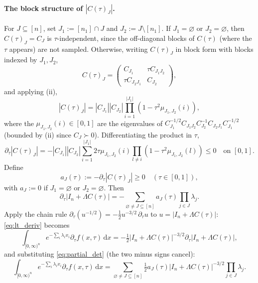 \documentclass[12pt,a4paper]{article}
\theoremstyle{definition}
\newcommand{\dd}{\mathrm{d}}
\begin{document}
\paragraph{The block structure of $|C(\tau)_J|$.}  For $J\subseteq[n]$, set
$J_1:=[n_1]\cap J$ and $J_2:=J\setminus[n_1]$.  If $J_1=\varnothing$
or $J_2=\varnothing$, then $C(\tau)_J=C_J$ is $\tau$-independent,
since the off-diagonal blocks of $C(\tau)$ (where the $\tau$ appears)
are not sampled.  Otherwise, writing $C(\tau)_J$ in block form with
blocks indexed by $J_1,J_2$,
\[
  C(\tau)_J
  =\begin{pmatrix}C_{J_1}&\tau C_{J_1J_2}\\
    \tau C_{J_2J_1}&C_{J_2}\end{pmatrix},
\]
and applying (ii),
\begin{equation}\label{eq:CtauJ}
  |C(\tau)_J|
  =|C_{J_1}||C_{J_2}|\prod_{i=1}^{|J_1|}(1-\tau^2\mu_{J_1,J_2}(i)),
\end{equation}
where the $\mu_{J_1,J_2}(i)\in[0,1]$ are the eigenvalues of
$C_{J_1}^{-1/2}C_{J_1J_2}C_{J_2}^{-1}C_{J_2J_1}C_{J_1}^{-1/2}$
(bounded by (ii) since $C_J\succ 0$).
Differentiating the product in $\tau$,
\[
  \partial_\tau|C(\tau)_J|
  =-|C_{J_1}||C_{J_2}|\sum_{i=1}^{|J_1|}2\tau\mu_{J_1,J_2}(i)
  \prod_{l\ne i}(1-\tau^2\mu_{J_1,J_2}(l))
  \leqslant 0\quad\text{on }[0,1].
\]
Define
\begin{equation}\label{eq:aJ}
  a_J(\tau):=-\partial_\tau|C(\tau)_J|\geqslant 0
  \quad(\tau\in[0,1]),
\end{equation}
with $a_J:=0$ if $J_1=\varnothing$ or $J_2=\varnothing$.  Then
\begin{equation}\label{eq:partial_det}
  \partial_\tau|I_n+\Lambda C(\tau)|
  =-\sum_{\varnothing\ne J\subseteq[n]}a_J(\tau)\prod_{j\in J}\lambda_j.
\end{equation}
Apply the chain rule
$\partial_\tau(u^{-1/2})=-\tfrac12 u^{-3/2}\,\partial_\tau u$ to
$u=|I_n+\Lambda C(\tau)|$: \eqref{eq:lt_deriv} becomes
\[
  \int_{[0,\infty)^n}e^{-\sum_i\lambda_ix_i}
    \partial_\tau f(x,\tau)\,\dd x
  =-\tfrac12|I_n+\Lambda C(\tau)|^{-3/2}
    \partial_\tau|I_n+\Lambda C(\tau)|,
\]
and substituting \eqref{eq:partial_det} (the two minus signs cancel):
\begin{equation}\label{eq:lt_of_ftau}
  \int_{[0,\infty)^n}e^{-\sum_i\lambda_ix_i}
  \partial_\tau f(x,\tau)\,\dd x
  =\sum_{\varnothing\ne J\subseteq[n]}
  \tfrac{1}{2}a_J(\tau)|I_n+\Lambda C(\tau)|^{-3/2}
  \prod_{j\in J}\lambda_j.
\end{equation}
\end{document}
